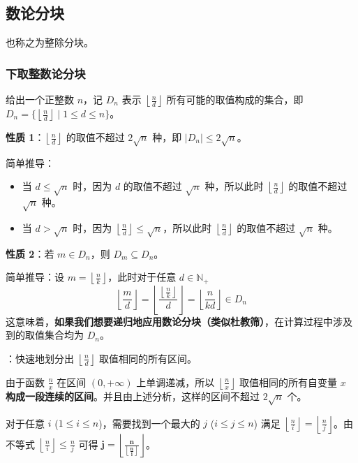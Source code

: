 \subsection{数论分块}

也称之为整除分块。

\subsubsection{下取整数论分块}

给出一个正整数 $n$，记 $D_n$ 表示 $\left\lfloor \frac{n}{d} \right\rfloor$ 所有可能的取值构成的集合，即 $D_n = \{ \left\lfloor \frac{n}{d} \right\rfloor \mid 1 \leq d \leq n \}$。

\textbf{性质 1}：$\left\lfloor \frac{n}{d} \right\rfloor$ 的取值不超过 $2\sqrt{n}$ 种，即 $|D_n| \leq 2\sqrt{n}$。

简单推导：

\begin{itemize}
    \item 当 $d \leq \sqrt{n}$ 时，因为 $d$ 的取值不超过 $\sqrt{n}$ 种，所以此时 $\left\lfloor \frac{n}{d} \right\rfloor$ 的取值不超过 $\sqrt{n}$ 种。
    \item 当 $d > \sqrt{n}$ 时，因为 $\left\lfloor \frac{n}{d} \right\rfloor \leq \sqrt{n}$，所以此时 $\left\lfloor \frac{n}{d} \right\rfloor$ 的取值不超过 $\sqrt{n}$ 种。
\end{itemize}

\textbf{性质 2}：若 $m \in D_n$，则 $D_m \subseteq D_n$。

简单推导：设 $m = \left\lfloor \frac{n}{k} \right\rfloor$，此时对于任意 $d \in \mathbb{N}_+$
\[
\left\lfloor \frac{m}{d} \right\rfloor = \left\lfloor \frac{\left\lfloor \frac{n}{k} \right\rfloor}{d} \right\rfloor = \left\lfloor \frac{n}{kd} \right\rfloor \in D_n
\]
这意味着，\textbf{如果我们想要递归地应用数论分块（类似杜教筛）}，在计算过程中涉及到的取值集合均为 $D_n$。

：快速地划分出 $\left\lfloor \frac{n}{d} \right\rfloor$ 取值相同的所有区间。

由于函数 $\frac{n}{x}$ 在区间 $(0, +\infty)$ 上单调递减，所以 $\left\lfloor \frac{n}{x} \right\rfloor$ 取值相同的所有自变量 $x$ \textbf{构成一段连续的区间}。并且由上述分析，这样的区间不超过 $2\sqrt{n}$ 个。

对于任意 $i$ ($1 \leq i \leq n$)，需要找到一个最大的 $j$ ($i \leq j \leq n$) 满足 $\left\lfloor \frac{n}{i} \right\rfloor = \left\lfloor \frac{n}{j} \right\rfloor$。由不等式 $\left\lfloor \frac{n}{i} \right\rfloor \leq \frac{n}{j}$ 可得 $\boldsymbol{j = \left\lfloor \frac{n}{\left\lfloor \frac{n}{i} \right\rfloor} \right\rfloor}$。

